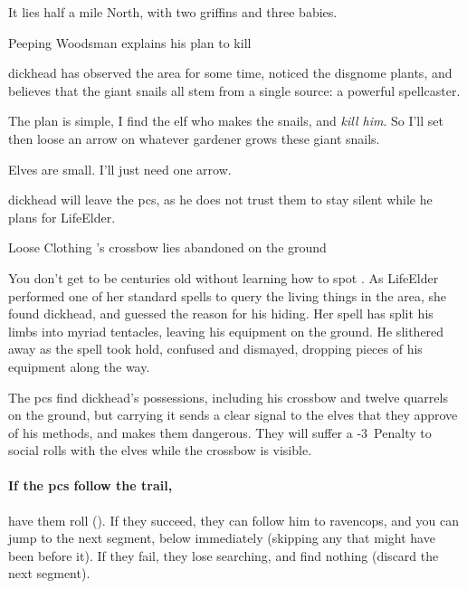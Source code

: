 \begin{multicols}{2}
\else
  It lies half a mile North, with two \glspl{griffin} and three babies.

\fi

{Peeping Woodsman}%
{ explains his plan to kill }%

\Gls{dickhead} has observed the area for some time, noticed the \gls{disgnome} plants, and believes that the giant snails all stem from a single source: a powerful spellcaster.

\begin{speechtext}
  The plan is simple, I find the elf who makes the snails, and \emph{kill him}.
  So I'll set  then loose an arrow on whatever gardener grows these giant snails.

  Elves are small.
  I'll just need one arrow.
\end{speechtext}

\Gls{dickhead} will leave the \glspl{pc}, as he does not trust them to stay silent while he plans  for \gls{LifeElder}.

{Loose Clothing}%
{'s crossbow lies abandoned on the ground}%

\begin{exampletext}
  You don't get to be centuries old without learning how to spot .
  As \gls{LifeElder} performed one of her standard spells to query the living things in the area, she found \gls{dickhead}, and guessed the reason for his hiding.
  Her spell has split his limbs into myriad tentacles, leaving his equipment on the ground.
  He slithered away as the spell took hold, confused and dismayed, dropping pieces of his equipment along the way.
\end{exampletext}

The \glspl{pc} find \gls{dickhead}'s possessions, including his \gls{crossbow} and twelve quarrels on the ground, but carrying it sends a clear signal to the elves that they approve of his methods, and makes them dangerous.
They will suffer a -3~Penalty to social rolls with the elves while the \gls{crossbow} is visible.

\paragraph{If the \glspl{pc} follow the trail,}
have them roll  (\tn[10]).
If they succeed, they can follow him to \gls{ravencops}, and you can jump to the next \gls{segment}, below immediately (skipping any that might have been before it).
If they fail, they lose  searching, and find nothing (discard the next \gls{segment}).


\end{multicols}

